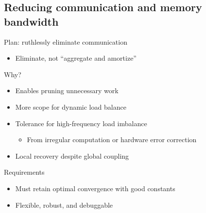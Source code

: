 \documentclass{beamer}
\begin{document}
\subsection{Reducing communication and memory bandwidth}
\begin{frame}{Plan: ruthlessly eliminate communication}
  \begin{itemize}
  \item Eliminate, not ``aggregate and amortize''
  \end{itemize}
  \begin{block}{Why?}
    \begin{itemize}
    \item Enables pruning unnecessary work
    \item More scope for dynamic load balance
    \item Tolerance for high-frequency load imbalance
      \begin{itemize}
      \item From irregular computation or hardware error correction
      \end{itemize}
    \item Local recovery despite global coupling
    \end{itemize}
  \end{block}
  \begin{block}{Requirements}
    \begin{itemize}
    \item Must retain optimal convergence with good constants
    \item Flexible, robust, and debuggable
    \end{itemize}
  \end{block}
\end{frame}

\end{document}
